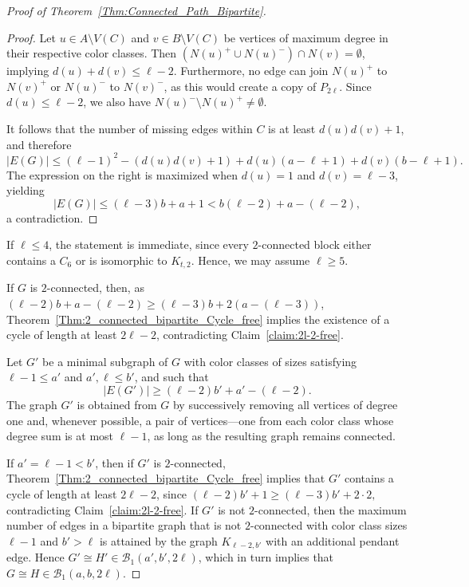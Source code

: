 \documentclass[11pt,a4paper]{article}
\begin{document}
\begin{proof}[Proof of Theorem~\ref{Thm:Connected_Path_Bipartite}]
\begin{proof}
Let $u \in A \setminus V(C)$ and $v \in B \setminus V(C)$ be vertices of maximum degree in their respective color classes.  
Then $(N(u)^+ \cup N(u)^-) \cap N(v) = \emptyset$, implying $d(u) + d(v) \le \ell - 2$.  
Furthermore, no edge can join $N(u)^+$ to $N(v)^+$ or $N(u)^-$ to $N(v)^-$, as this would create a copy of $P_{2\ell}$.  
Since $d(u) \le \ell - 2$, we also have $N(u)^- \setminus N(u)^+ \neq \emptyset$.  

It follows that the number of missing edges within $C$ is at least $d(u)d(v) + 1$, and therefore
\[
|E(G)| \le (\ell - 1)^2 - (d(u)d(v) + 1) + d(u)(a - \ell + 1) + d(v)(b - \ell + 1).
\]
The expression on the right is maximized when $d(u) = 1$ and $d(v) = \ell - 3$, yielding
\[
|E(G)| \le (\ell - 3)b + a + 1 < b(\ell - 2) + a - (\ell - 2),
\]
a contradiction.
\end{proof}


If $\ell \le 4$, the statement is immediate, since every $2$-connected block either contains a $C_6$ or is isomorphic to $K_{t,2}$.  
Hence, we may assume $\ell \ge 5$.  

If $G$ is $2$-connected, then, as $(\ell - 2)b + a - (\ell - 2) \ge (\ell - 3)b + 2(a - (\ell - 3))$, Theorem~\ref{Thm:2_connected_bipartite_Cycle_free} implies the existence of a cycle of length at least $2\ell - 2$, contradicting Claim~\ref{claim:2l-2-free}.  



Let $G'$ be a minimal subgraph of $G$ with color classes of sizes satisfying 
$\ell - 1 \le a'$ and $a', \ell \le b'$, and such that 
\[
|E(G')| \ge (\ell - 2)b' + a' - (\ell - 2).
\]
The graph $G'$ is obtained from $G$ by successively removing all vertices of degree one and, whenever possible, a pair of vertices—one from each color class whose degree sum is at most $\ell - 1$, as long as the resulting graph remains connected.

If $a' = \ell - 1 < b'$, then if $G'$ is $2$-connected, Theorem~\ref{Thm:2_connected_bipartite_Cycle_free} implies that $G'$ contains a cycle of length at least $2\ell - 2$, since $(\ell - 2)b' + 1 \ge (\ell - 3)b' + 2 \cdot 2,$
contradicting Claim~\ref{claim:2l-2-free}.
If $G'$ is not $2$-connected, then the maximum number of edges in a bipartite graph that is not $2$-connected with color class sizes $\ell - 1$ and $b' > \ell$ is attained by the graph $K_{\ell - 2, b'}$ with an additional pendant edge.
Hence $G' \cong H' \in \mathcal{B}_1(a', b', 2\ell)$, which in turn implies that $G \cong H \in \mathcal{B}_1(a, b, 2\ell)$.




\end{proof}
\end{document}
